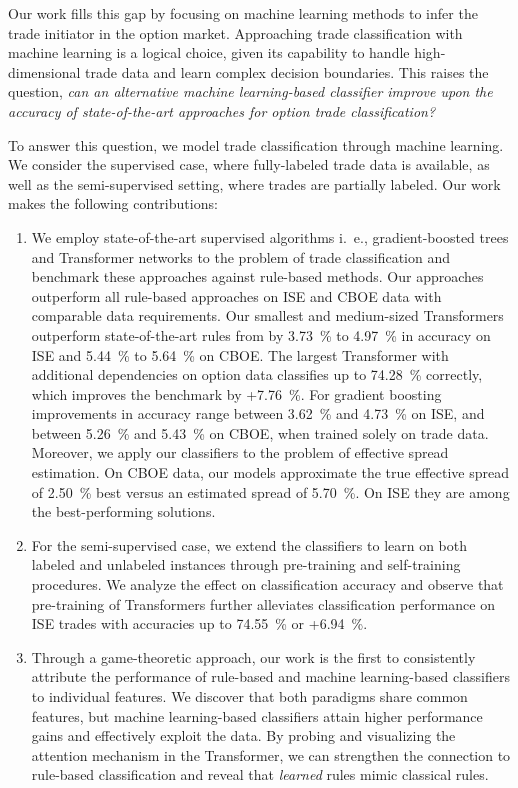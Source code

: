 Our work fills this gap by focusing on machine learning methods to infer the trade initiator in the option market. Approaching trade classification with machine learning is a logical choice, given its capability to handle high-dimensional trade data and learn complex decision boundaries. This raises the question, \emph{can an alternative machine learning-based classifier improve upon the accuracy of state-of-the-art approaches for option trade classification?}

To answer this question, we model trade classification through machine learning. We consider the supervised case, where fully-labeled trade data is available, as well as the semi-supervised setting, where trades are partially labeled. Our work makes the following contributions:
\begin{enumerate}[label=(\roman*),noitemsep]
    \item We employ state-of-the-art supervised algorithms i.~e., gradient-boosted trees and Transformer networks to the problem of trade classification and benchmark these approaches against rule-based methods. Our approaches outperform all rule-based approaches on \gls{ISE} and \gls{CBOE} data with comparable data requirements. Our smallest and medium-sized Transformers outperform state-of-the-art rules from \textcite[][13--15]{grauerOptionTradeClassification2022} by \SI{3.73}{\percent} to \SI{4.97}{\percent} in accuracy on \gls{ISE} and \SI{5.44}{\percent} to \SI{5.64}{\percent} on \gls{CBOE}. The largest Transformer with additional dependencies on option data classifies up to \SI{74.28}{\percent} correctly, which improves the benchmark by +\SI{7.76}{\percent}. For gradient boosting improvements in accuracy range between \SI{3.62}{\percent} and \SI{4.73}{\percent} on \gls{ISE}, and between \SI{5.26}{\percent} and \SI{5.43}{\percent} on \gls{CBOE}, when trained solely on trade data. Moreover, we apply our classifiers to the problem of effective spread estimation. On \gls{CBOE} data, our models approximate the true effective spread of \SI{2.50}{\percent} best versus an estimated spread of \SI{5.70}{\percent}. On \gls{ISE} they are among the best-performing solutions.
    \item For the semi-supervised case, we extend the classifiers to learn on both labeled and unlabeled instances through pre-training and self-training procedures. We analyze the effect on classification accuracy and observe that pre-training of Transformers further alleviates classification performance on \gls{ISE} trades with accuracies up to \SI{74.55}{\percent} or +\SI{6.94}{\percent}.
    \item Through a game-theoretic approach, our work is the first to consistently attribute the performance of rule-based and machine learning-based classifiers to individual features. We discover that both paradigms share common features, but machine learning-based classifiers attain higher performance gains and effectively exploit the data. By probing and visualizing the attention mechanism in the Transformer, we can strengthen the connection to rule-based classification and reveal that \emph{learned} rules mimic classical rules.
\end{enumerate}

